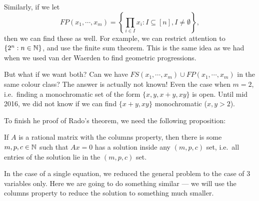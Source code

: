 \documentclass[a4paper]{article}
\begin{document}
  Similarly, if we let
  \[
    FP(x_1, \cdots, x_m) = \left\{\prod_{i \in I} x_i : I \subseteq [n], I \not= \emptyset\right\},
  \]
  then we can find these as well. For example, we can restrict attention to $\{2^n: n \in \mathbb{N}\}$, and use the finite sum theorem. This is the same idea as we had when we used van der Waerden to find geometric progressions.

  But what if we want both? Can we have $FS(x_1,\cdots, x_m) \cup FP(x_1, \cdots, x_m)$ in the same colour class? The answer is actually not known! Even the case when $m = 2$, i.e.\ finding a monochromatic set of the form $\{x, y, x + y, xy\}$ is open. Until mid 2016, we did not know if we can find $\{x + y, xy\}$ monochromatic ($x, y > 2$).

  To finish he proof of Rado's theorem, we need the following proposition:
  \begin{prop}
    If $A$ is a rational matrix with the columns property, then there is some $m, p, c \in \mathbb{N}$ such that $Ax = 0$ has a solution inside any $(m, p, c)$ set, i.e.\ all entries of the solution lie in the $(m, p, c)$ set.
  \end{prop}
  In the case of a single equation, we reduced the general problem to the case of 3 variables only. Here we are going to do something similar --- we will use the columns property to reduce the solution to something much smaller.
\end{document}
